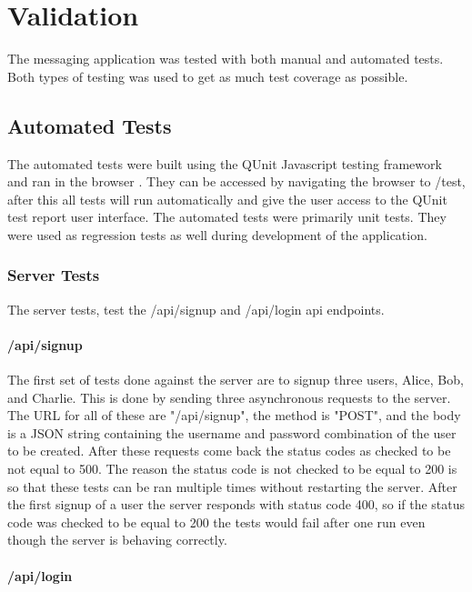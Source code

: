 \chapter{Validation}


The messaging application was tested with both manual and automated tests. Both types of testing was used to get as much test coverage as possible.


\section{Automated Tests}


The automated tests were built using the QUnit Javascript testing framework and ran in the browser \cite{qunit}. They can be accessed by navigating the browser to /test, after this all tests will run automatically and give the user access to the QUnit test report user interface. The automated tests were primarily unit tests. They were used as regression tests as well during development of the application. 


\subsection{Server Tests}


The server tests, test the /api/signup and /api/login api endpoints. 


\subsubsection{/api/signup}


The first set of tests done against the server are to signup three users, Alice, Bob, and Charlie.
This is done by sending three asynchronous requests to the server. The URL for all of these are "/api/signup", the method is "POST", and the body is a JSON string containing the username and password combination of the user to be created. After these requests come back the status codes as checked to be not equal to 500. The reason the status code is not checked to be equal to 200 is so that these tests can be ran multiple times without restarting the server. After the first signup of a user the server responds with status code 400, so if the status code was checked to be equal to 200 the tests would fail after one run even though the server is behaving correctly.


\subsubsection{/api/login}


